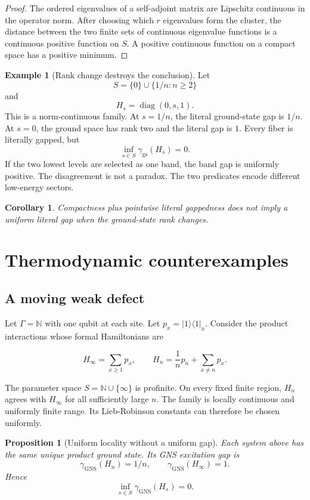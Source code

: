 \documentclass[12pt]{article}
\newtheorem{proposition}[theorem]{Proposition}
\newtheorem{corollary}[theorem]{Corollary}
\theoremstyle{definition}
\newtheorem{example}[theorem]{Example}
\theoremstyle{remark}
\begin{document}
\begin{proof}
The ordered eigenvalues of a self-adjoint matrix are Lipschitz continuous in
the operator norm. After choosing which $r$ eigenvalues form the cluster, the
distance between the two finite sets of continuous eigenvalue functions is a
continuous positive function on $S$. A positive continuous function on a
compact space has a positive minimum.
\end{proof}

\begin{example}[Rank change destroys the conclusion]
\label{ex:matrix-collapse}
Let
\[
S=\{0\}\cup\{1/n:n\geq2\}
\]
and
\[
H_s=\operatorname{diag}(0,s,1).
\]
This is a norm-continuous family. At $s=1/n$, the literal ground-state gap is
$1/n$. At $s=0$, the ground space has rank two and the literal gap is $1$.
Every fiber is literally gapped, but
\[
\inf_{s\in S}\gamma_{\mathrm{gs}}(H_s)=0.
\]
If the two lowest levels are selected as one band, the band gap is uniformly
positive. The disagreement is not a paradox. The two predicates encode
different low-energy sectors.
\end{example}

\begin{corollary}
Compactness plus pointwise literal gappedness does not imply a uniform literal
gap when the ground-state rank changes.
\end{corollary}

\section{Thermodynamic counterexamples}

\subsection{A moving weak defect}

Let $\Gamma=\mathbb N$ with one qubit at each site. Let
$p_x=|1\rangle\langle1|_x$. Consider the product interactions whose formal
Hamiltonians are

\[
H_\infty=\sum_{x\geq1}p_x,
\qquad
H_n=\frac{1}{n}p_n+\sum_{x\neq n}p_x.
\]

The parameter space $S=\mathbb N\cup\{\infty\}$ is profinite. On every fixed
finite region, $H_n$ agrees with $H_\infty$ for all sufficiently large $n$.
The family is locally continuous and uniformly finite range. Its
Lieb-Robinson constants can therefore be chosen uniformly.

\begin{proposition}[Uniform locality without a uniform gap]
Each system above has the same unique product ground state. Its GNS excitation
gap is
\[
\gamma_{\mathrm{GNS}}(H_n)=1/n,
\qquad
\gamma_{\mathrm{GNS}}(H_\infty)=1.
\]
Hence
\[
\inf_{s\in S}\gamma_{\mathrm{GNS}}(H_s)=0.
\]
\end{proposition}
\end{document}
